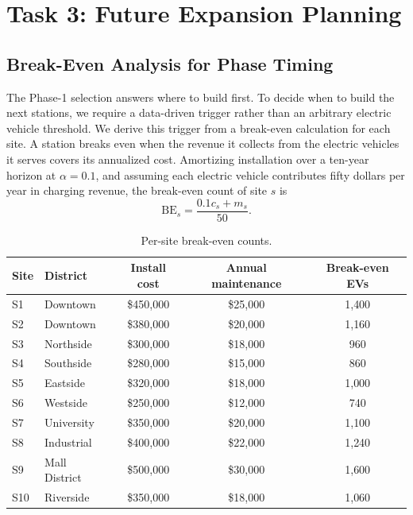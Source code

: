 \documentclass[11pt]{article}
\begin{document}
\section{Task 3: Future Expansion Planning}
\label{sec:expansion}

\subsection{Break-Even Analysis for Phase Timing}
\label{sec:breakeven}

The Phase-1 selection answers where to build first. To decide when to build the next stations, we require a data-driven trigger rather than an arbitrary electric vehicle threshold. We derive this trigger from a break-even calculation for each site. A station breaks even when the revenue it collects from the electric vehicles it serves covers its annualized cost. Amortizing installation over a ten-year horizon at $\alpha = 0.1$, and assuming each electric vehicle contributes fifty dollars per year in charging revenue, the break-even count of site $s$ is
\begin{equation}
\mathrm{BE}_s = \frac{0.1 c_s + m_s}{50}.
\end{equation}

\begin{table}[H]
\centering
\caption{Per-site break-even counts.}
\label{tab:breakeven}
\begin{tabular}{llccc}
\toprule
Site & District & Install cost & Annual maintenance & Break-even EVs \\
\midrule
S1  & Downtown      & \$450{,}000 & \$25{,}000 & 1{,}400 \\
S2  & Downtown      & \$380{,}000 & \$20{,}000 & 1{,}160 \\
S3  & Northside     & \$300{,}000 & \$18{,}000 &   960 \\
S4  & Southside     & \$280{,}000 & \$15{,}000 &   860 \\
S5  & Eastside      & \$320{,}000 & \$18{,}000 & 1{,}000 \\
S6  & Westside      & \$250{,}000 & \$12{,}000 &   740 \\
S7  & University    & \$350{,}000 & \$20{,}000 & 1{,}100 \\
S8  & Industrial    & \$400{,}000 & \$22{,}000 & 1{,}240 \\
S9  & Mall District & \$500{,}000 & \$30{,}000 & 1{,}600 \\
S10 & Riverside     & \$350{,}000 & \$18{,}000 & 1{,}060 \\
\bottomrule
\end{tabular}
\end{table}
\end{document}
